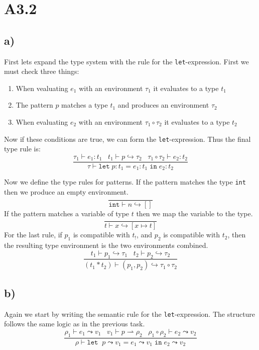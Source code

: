 \section*{A3.2}

\subsection*{a)}
First lets expand the type system with the rule for the \texttt{let}-expression. First we must check three things:
\begin{enumerate}
	\item When vealuating $e_1$ with an environment $\tau_1$ it evaluates to a type $t_1$
	\item The pattern $p$ matches a type $t_1$ and produces an environment $\tau_2$
	\item When evaluating $e_2$ with an environment $\tau_1 \circ \tau_2$ it evaluates to a type $t_2$
\end{enumerate}
Now if these conditions are true, we can form the \texttt{let}-expression. Thus the final type rule is:
$$\frac{\tau_1 \vdash e_1 : t_1 \; \; \; t_1 \vdash p \hookrightarrow \tau_2 \; \; \; \tau_1 \circ \tau_2 \vdash e_2 : t_2}{\tau \vdash \texttt{let} \; p:t_1 = e_1:t_1 \; \texttt{in} \; e_2:t_2}$$

Now we define the type rules for patterns. If the pattern matches the type \texttt{int} then we produce an empty environment.
$$\frac{}{\texttt{int}\vdash n \hookrightarrow []}$$
If the pattern matches a variable of type $t$ then we map the variable to the type.
$$\frac{}{t\vdash x \hookrightarrow [x \mapsto t]}$$
For the last rule, if $p_1$ is compatible with $t_!$, and $p_2$ is compatible with $t_2$, then the resulting type environment is the two environments combined.
$$\frac{t_1 \vdash p_1 \hookrightarrow \tau_1 \;\;\; t_2 \vdash p_2 \hookrightarrow \tau_2}{(t_1*t_2) \vdash (p_1,p_2) \hookrightarrow \tau_1 \circ \tau_2}$$

\subsection*{b)}
Again we start by writing the semantic rule for the \texttt{let}-expression. The structure follows the same logic as in the previous task.
$$\frac{\rho_1 \vdash e_1 \leadsto v_1 \;\;\; v_1 \vdash p \rightharpoonup \rho_2 \;\;\; \rho_1 \circ \rho_2 \vdash e_2 \leadsto v_2}{\rho \vdash \texttt{let} \;\; p \leadsto v_1 = e_1 \leadsto v_1 \; \texttt{in} \; e_2 \leadsto v_2}$$

